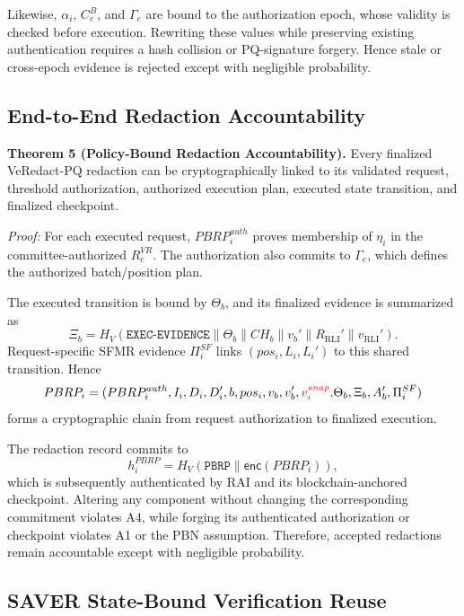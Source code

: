 \documentclass[lettersize,journal]{IEEEtran}
\begin{document}
Likewise,
$\alpha_i$, $C_e^B$, and $\Gamma_e$ are bound to the authorization
epoch, whose validity is checked before execution. Rewriting these
values while preserving existing authentication requires a hash
collision or PQ-signature forgery. Hence stale or cross-epoch evidence
is rejected except with negligible probability.

\subsection{End-to-End Redaction Accountability}

\textbf{Theorem 5 (Policy-Bound Redaction Accountability).}
Every finalized VeRedact-PQ redaction can be cryptographically linked
to its validated request, threshold authorization, authorized execution
plan, executed state transition, and finalized checkpoint.

\emph{Proof:}
For each executed request, $PBRP_i^{auth}$ proves membership of
$\eta_i$ in the committee-authorized $R_e^{VR}$. The authorization
also commits to $\Gamma_e$, which defines the authorized batch/position
plan.

The executed transition is bound by $\Theta_b$, and its finalized
evidence is summarized as
\begin{equation}
\Xi_b=
H_V(\texttt{EXEC-EVIDENCE}\parallel
\Theta_b\parallel CH_b\parallel v_b'
\parallel R_{\mathrm{RLI}}'\parallel v_{\mathrm{RLI}}').
\end{equation}
Request-specific SFMR evidence $\Pi_i^{SF}$ links
$(pos_i,L_i,L_i')$ to this shared transition. Hence
\begin{equation}
PBRP_i=
(PBRP_i^{auth},I_i,D_i,D_i',b,pos_i,
v_b,v_b',\textcolor{red}{v_i^{snap},}\Theta_b,\Xi_b,A_b',\Pi_i^{SF})
\end{equation}
forms a cryptographic chain from request authorization to finalized
execution.

The redaction record commits to
\begin{equation}
h_i^{PBRP}
=
H_V(\texttt{PBRP}\parallel\mathsf{enc}(PBRP_i)),
\end{equation}
which is subsequently authenticated by RAI and its blockchain-anchored
checkpoint. Altering any component without changing the corresponding
commitment violates A4, while forging its authenticated authorization
or checkpoint violates A1 or the PBN assumption. Therefore, accepted
redactions remain accountable except with negligible probability.


\subsection{SAVER State-Bound Verification Reuse}
\end{document}
